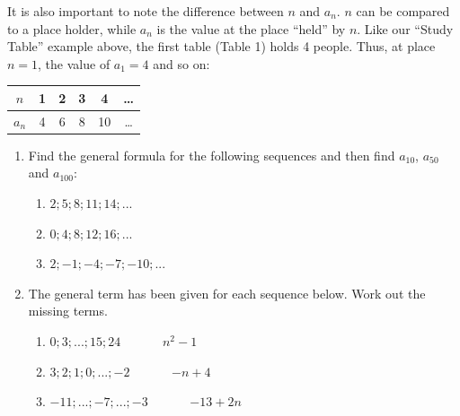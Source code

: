     \noindent
      \label{m39362*id65378}It is also important to note the difference between $n$ and ${a}_{n}$. $n$ can be compared to a place holder, while ${a}_{n}$ is the value at the place ``held'' by $n$. Like our ``Study Table'' example above, the first table (Table 1) holds 4 people. Thus, at place $n=1$, the value of ${a}_{1}=4$ and so on:\par 
    
\begin{center}
\begin{tabular}{|c|c|c|c|c|c|}
\hline $n$ & 1 & 2 & 3 & 4 & \ldots \\
\hline $a_n$ & 4 & 6 & 8 & 10 & \ldots \\
\hline
\end{tabular}
\end{center}
\label{m39362*secfhsst!!!underscore!!!id1060}
            \nopagebreak
      \label{m39362*id65612}\begin{enumerate}[noitemsep, label=\textbf{\arabic*}. ] 
            \label{m39362*uid17}\item Find the general formula for the following sequences and then find ${a}_{10}$, ${a}_{50}$ and ${a}_{100}$:
\label{m39362*id65671}\begin{enumerate}[noitemsep, label=\textbf{\alph*}. ] 
            \label{m39362*uid18}\item $2;5;8;11;14;...$\label{m39362*uid19}\item $0;4;8;12;16;...$\label{m39362*uid20}\item $2;-1;-4;-7;-10;...$\end{enumerate}
        \label{m39362*uid21}\item The general term has been given for each sequence below. Work out the missing terms.
\label{m39362*id65820}\begin{enumerate}[noitemsep, label=\textbf{\alph*}. ] 
            \label{m39362*uid22}\item $0;3;...;15;24$ ~~~~~~${n}^{2}-1$\label{m39362*uid23}\item $3;2;1;0;...;-2$ ~~~~~~$-n+4$\label{m39362*uid24}\item $-11;...;-7;...;-3$ ~~~~~~$-13+2n$\end{enumerate}
        \end{enumerate}
      \label{m39362*uid25}
